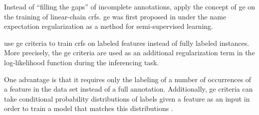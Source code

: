 Instead of ``filling the gaps'' of incomplete annotations, \citet{mann2008generalized} apply the concept of \gls{ge} on the training of linear-chain \glspl{crf}.
\Gls{ge} was first proposed in \citet{mann2007simple} under the name \gls{expectation regularization} as a method for semi-supervised learning.

\citet{mann2008generalized} use \gls{ge} criteria to train \glspl{crf} on labeled features instead of fully labeled instances.
More precisely, the \gls{ge} criteria are used as an additional regularization term in the log-likelihood function during the inferencing task.

One advantage is that it requires only the labeling of a number of occurrences of a feature in the data set instead of a full annotation.
Additionally, \gls{ge} criteria can take \glspl{conditional probability distribution} of labels given a feature as an input in order to train a model that matches this distributions \citep{mann2008generalized}.

\bigskip

